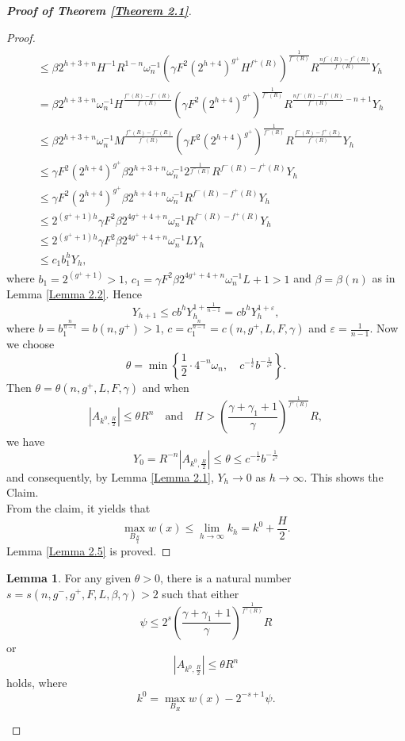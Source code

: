 \documentclass[10pt,reqno]{amsart}
\newcommand *\w{^\wedge}
\theoremstyle{definition}
\newtheorem{lemma}[theorem]{Lemma}
\numberwithin{equation}{section}
\begin{document}
\begin{proof}[\textbf{Proof of Theorem \ref{Theorem 2.1}}]
\begin{proof}
\begin{align}
\begin{split}
&\leq \beta 2^{h+3+n}H^{-1}R^{1-n}\omega_n^{-1}\left( \gamma F^2\left(2^{h+4}\right)^{g^+} H^{f^+(R)} \right)^{\frac{1}{f^-(R)}}R^{\frac{nf^-(R)-f^+(R)}{f^-(R)}}Y_h\\
&= \beta 2^{h+3+n}\omega_n^{-1}H^{\frac{f^+(R)-f^-(R)}{f^{-}(R)}}\left( \gamma F^2\left(2^{h+4}\right)^{g^+}  \right)^{\frac{1}{f^-(R)}}R^{\frac{nf^-(R)-f^+(R)}{f^-(R)}-n+1}Y_h\\
& \leq \beta 2^{h+3+n}\omega_n^{-1}M^{\frac{f^+(R)-f^-(R)}{f^{-}(R)}}\left( \gamma F^2\left(2^{h+4}\right)^{g^+}  \right)^{\frac{1}{f^-(R)}} R^{\frac{f^-(R)-f^+(R)}{f^-(R)}}Y_h\\
& \leq \gamma F^2\left(2^{h+4}\right)^{g^+}\beta 2^{h+3+n}\omega_n^{-1}2^{\frac{1}{f^{-}(R)}} R^{f^-(R)-f^+(R)}Y_h\\
& \leq \gamma F^2\left(2^{h+4}\right)^{g^+}\beta 2^{h+4+n}\omega_n^{-1} R^{f^-(R)-f^+(R)}Y_h\\
& \leq 2^{(g^++1)h}\gamma F^2\beta 2^{4g^++4+n}\omega_n^{-1} R^{f^-(R)-f^+(R)}Y_h\\
& \leq 2^{(g^++1)h}\gamma F^2\beta 2^{4g^++4+n}\omega_n^{-1} L Y_h\\
&\leq c_1 b_1^h Y_h,
\end{split}
\end{align}
where \(b_1 = 2^{(g^++1)} > 1\), \(c_1 = \gamma F^2\beta 2^{4g^++4+n}\omega_n^{-1} L+1 > 1\) and \(\beta = \beta(n)\) as in Lemma \ref{Lemma 2.2}. Hence
\[
Y_{h+1} \leq c b^h Y_h^{1+\frac{1}{n-1}} = c b^h Y_h^{1+\varepsilon},
\]
where \(b = b_1^{\frac{n}{n-1}} = b(n,g^+) > 1\), \(c = c_1^{\frac{n}{n-1}} = c(n,g^+, L, F,\gamma)\) and \(\varepsilon = \frac{1}{n-1}\).
Now we choose
\[
\theta = \min\left\{ \frac{1}{2} \cdot 4^{-n}\omega_n, \quad c^{-\frac{1}{\varepsilon}}b^{-\frac{1}{\varepsilon^2}} \right\}.
\]
Then \(\theta = \theta(n,g^+, L, F,\gamma)\) and when
\[
|A_{k^0, \frac{R}{2}}| \leq \theta R^n \quad \text{and} \quad H > \left( \frac{\gamma  + \gamma_1 + 1}{\gamma} \right)^{\frac{1}{f^+(R)}}R,
\]
we have
\[
Y_0 = R^{-n}|A_{k^0, \frac{R}{2}}| \leq \theta \leq c^{-\frac{1}{\varepsilon}}b^{-\frac{1}{\varepsilon^2}}
\]
and consequently, by Lemma \ref{Lemma 2.1}, \(Y_h \to 0\) as \(h \to \infty\). This shows the Claim.\\
From the claim, it yields that
\[
\max_{B_{\frac{R}{4}}} w(x) \leq \lim_{h \to \infty} k_h = k^0 + \frac{H}{2}.
\]
Lemma \ref{Lemma 2.5} is proved.
\end{proof}

\begin{lemma}\label{Lemma 2.6}
For any given \(\theta > 0\), there is a natural number \(s = s(n,g^-,g^+,F,L,\beta,\gamma) > 2\) such that either
\begin{equation}\label{2.29}
\psi \leq 2^s \left( \frac{\gamma + \gamma_1 + 1}{\gamma} \right)^{\frac{1}{f^+(R)}} R
\end{equation}
or
\begin{equation}\label{2.30}
|A_{k^0, \frac{R}{2}}| \leq \theta R^n
\end{equation}
hol{\rm d}s, where
\[
k^0 = \max_{B_R} w(x) - 2^{-s+1}\psi.
\]
\end{lemma}


\end{proof}
\end{document}
